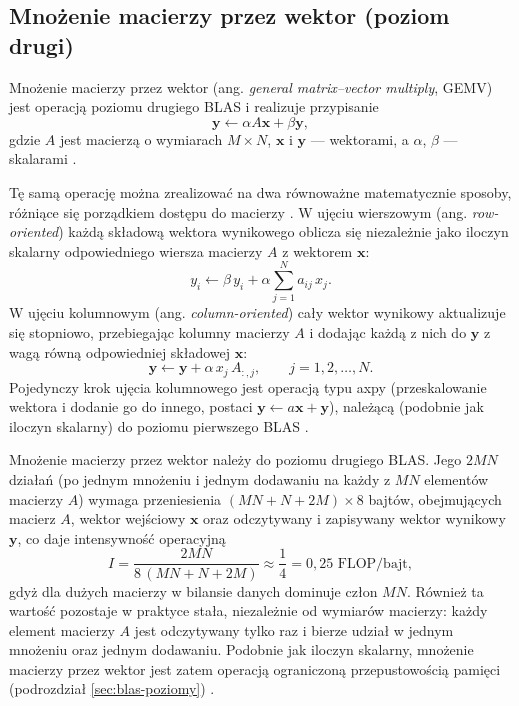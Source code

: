 \documentclass[a4paper,12pt]{book} %
\begin{document}
\subsection{Mnożenie macierzy przez wektor (poziom drugi)}
\label{sec:op-gemv}

Mnożenie macierzy przez wektor (ang. \emph{general matrix--vector multiply}, GEMV) jest operacją poziomu drugiego BLAS i realizuje przypisanie
\[
  \mathbf{y} \leftarrow \alpha A \mathbf{x} + \beta \mathbf{y},
\]
gdzie $A$ jest macierzą o wymiarach $M \times N$, $\mathbf{x}$ i $\mathbf{y}$ --- wektorami, a $\alpha$, $\beta$ --- skalarami \cite{dongarra1988blas2}.

Tę samą operację można zrealizować na dwa równoważne matematycznie sposoby, różniące się porządkiem dostępu do macierzy \cite{golub2013matrix}. W ujęciu wierszowym (ang. \emph{row-oriented}) każdą składową wektora wynikowego oblicza się niezależnie jako iloczyn skalarny odpowiedniego wiersza macierzy $A$ z wektorem $\mathbf{x}$:
\[
  y_i \leftarrow \beta\, y_i + \alpha \sum_{j=1}^{N} a_{ij}\, x_j .
\]
W ujęciu kolumnowym (ang. \emph{column-oriented}) cały wektor wynikowy aktualizuje się stopniowo, przebiegając kolumny macierzy $A$ i dodając każdą z nich do $\mathbf{y}$ z wagą równą odpowiedniej składowej $\mathbf{x}$:
\[
  \mathbf{y} \leftarrow \mathbf{y} + \alpha\, x_j\, A_{:,j}, \qquad j = 1, 2, \dots, N .
\]
Pojedynczy krok ujęcia kolumnowego jest operacją typu axpy (przeskalowanie wektora i dodanie go do innego, postaci $\mathbf{y} \leftarrow a\mathbf{x} + \mathbf{y}$), należącą (podobnie jak iloczyn skalarny) do poziomu pierwszego BLAS \cite{lawson1979blas,golub2013matrix}.

Mnożenie macierzy przez wektor należy do poziomu drugiego BLAS. Jego $2MN$ działań (po jednym mnożeniu i jednym dodawaniu na każdy z $MN$ elementów macierzy $A$) wymaga przeniesienia $(MN + N + 2M)\times 8$ bajtów, obejmujących macierz $A$, wektor wejściowy $\mathbf{x}$ oraz odczytywany i zapisywany wektor wynikowy $\mathbf{y}$, co daje intensywność operacyjną
\[
  I = \frac{2MN}{8\,(MN + N + 2M)} \approx \frac{1}{4} = 0{,}25 \text{ FLOP/bajt},
\]
gdyż dla dużych macierzy w bilansie danych dominuje człon $MN$. Również ta wartość pozostaje w praktyce stała, niezależnie od wymiarów macierzy: każdy element macierzy $A$ jest odczytywany tylko raz i bierze udział w jednym mnożeniu oraz jednym dodawaniu. Podobnie jak iloczyn skalarny, mnożenie macierzy przez wektor jest zatem operacją ograniczoną przepustowością pamięci (podrozdział \ref{sec:blas-poziomy}) \cite{williams2009roofline}.
\end{document}
